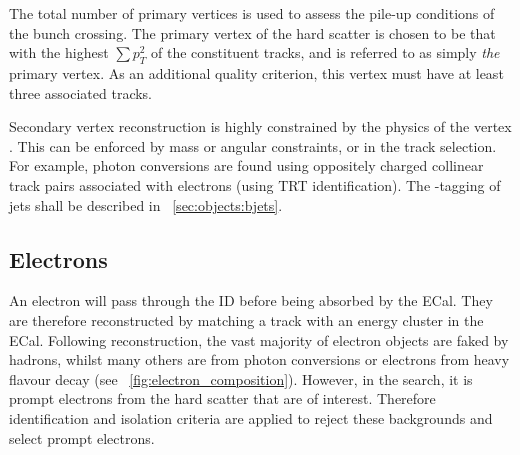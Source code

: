 The total number of primary vertices \npv is used to assess the pile-up conditions of 
the bunch crossing. The primary vertex of the hard scatter is chosen to be that with the 
highest $\sum p_T^2$ of the constituent tracks, and is referred to as simply \textit{the} 
primary vertex. As an additional quality criterion, this vertex must have at least three 
associated tracks.

Secondary vertex reconstruction is highly constrained by the physics of the vertex 
\cite{AllVertexFinding}. This can be enforced by mass or angular constraints, or in the 
track selection. For example, photon conversions are found using oppositely charged 
collinear track pairs associated with electrons (using \acs{TRT} identification).
The \Pbottom-tagging of jets shall be described in \Section~\ref{sec:objects:bjets}.



\subsection{Electrons}
\label{sec:objects:electrons}

An electron will pass through the \ac{ID} before being absorbed by the \ac{ECal}. They 
are therefore reconstructed by matching a track with an energy cluster in the \ac{ECal}. 
Following reconstruction, the vast majority of electron objects are faked by hadrons, 
whilst many others are from photon conversions or electrons from heavy flavour decay (see 
\Figure~\ref{fig:electron_composition}). However, in the \HWWlvlv search, it is prompt 
electrons from the hard scatter that are of interest. Therefore identification and 
isolation criteria are applied to reject these backgrounds and select prompt electrons.

